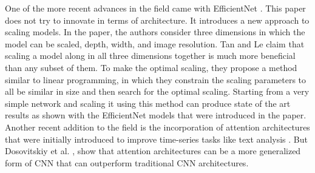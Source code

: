 \documentclass[../main.tex]{subfiles}
\begin{document}
One of the more recent advances in the field came with EfficientNet \cite{effnet}. This paper does not try to innovate in terms of architecture.
It introduces a new approach to scaling models. In the paper, the authors consider three dimensions in which the model can be scaled, depth, width, and image resolution.
Tan and Le \cite{effnet} claim that scaling a model along in all three dimensions together is much more beneficial than any subset of them.
To make the optimal scaling, they propose a method similar to linear programming, in which they constrain the scaling parameters to all be similar in size
and then search for the optimal scaling.
Starting from a very simple network and scaling it using this method can produce state of the art results
as shown with the EfficientNet models that were introduced in the paper.
Another recent addition to the field is the incorporation of attention architectures that were initially introduced to improve
time-series tasks like text analysis \cite{attention}. But Dosovitskiy et al. \cite{image-attention}, show that attention architectures can be a more generalized
form of CNN that can outperform traditional CNN architectures.
\end{document}
